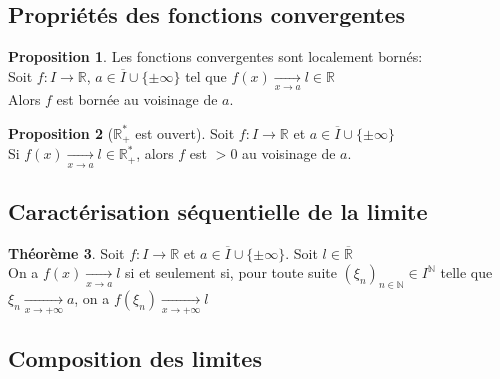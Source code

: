 \documentclass[10pt,a4paper]{article}
\theoremstyle{definition}
\newtheorem{proposition}{Proposition}[section]
\newtheorem{theorem}[proposition]{Théorème}
\begin{document}
\subsection{Propriétés des fonctions convergentes}
\begin{proposition}
Les fonctions convergentes sont localement bornés: \\
Soit $f: I \to \mathbb{R}$, $a \in \overline{I} \cup \{ \pm\infty \}$ tel que $f(x) \xrightarrow[x \to a]{} l \in \mathbb{R}$ \\
Alors $f$ est bornée au voisinage de $a$.
\end{proposition}
\begin{proposition}[$\mathbb{R}_+^*$ est ouvert]
Soit $f: I \to \mathbb{R}$ et $a \in \overline{I} \cup \{ \pm\infty \}$ \\
Si $f(x) \xrightarrow[x \to a]{} l \in \mathbb{R}_+^*$, alors $f$ est $>0$ au voisinage de $a$.
\end{proposition}

\subsection{Caractérisation séquentielle de la limite}
\begin{theorem}
Soit $f: I \to \mathbb{R}$ et $a \in \overline{I} \cup \{ \pm\infty \}$. Soit $l \in \overline{\mathbb{R}}$ \\
On a $f(x) \xrightarrow[x \to a]{} l$ si et seulement si, pour toute suite $(\xi_n)_{n \in \mathbb{N}} \in I^\mathbb{N}$ telle que $\xi_n \xrightarrow[x \to +\infty]{} a$, on a $f(\xi_n) \xrightarrow[x \to +\infty]{} l$
\end{theorem}

\subsection{Composition des limites}
\end{document}
